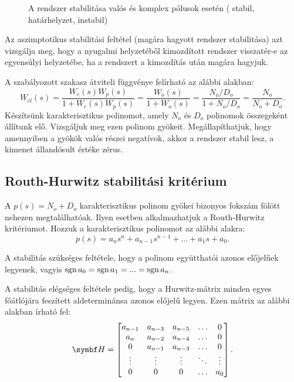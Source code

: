 \begin{figure}[htb]
  \centering
  
  \caption{
    A rendszer stabilitása valós és komplex pólusok esetén
    ({\color{darkBlue} stabil},
    {\color{darkYellow} határhelyzet},
    {\color{darkRed} instabil})
  }
  \label{fig:asymptotic-poles}
\end{figure}
Az aszimptotikus stabilitási feltétel (magára hagyott rendszer stabilitása)
azt vizsgálja meg, hogy a nyugalmi helyzetéből kimozdított rendszer visszatér-e
az egyensúlyi helyzetébe, ha a rendszert a kimozdítás után magára hagyjuk.

A szabályozott szakasz átviteli függvénye felírható az alábbi alakban:
\begin{equation}
  W_{cl}(s)
  = \frac{W_c(s) W_p(s)}{1 + W_c(s) W_p(s)}
  = \frac{W_o(s)}{1 + W_o(s)}
  = \frac{N_o / D_o}{1 + N_o / D_o}
  = \frac{N_o}{N_o + D_o}
  .
  \label{eq:asymptotic-cl}
\end{equation}
Készítsünk karakterisztikus polinomot, amely $N_o$ és $D_o$ polinomok
összegeként állítunk elő. Vizsgáljuk meg ezen polinom gyökeit. Megállapíthatjuk,
hogy amennyiben a gyökök valós részei negatívok, akkor a rendszer stabil lesz,
a kimenet állandósult értéke zérus.

\subsection{Routh-Hurwitz stabilitási kritérium}

A $p(s) = N_o + D_o$ karakterisztikus polinom gyökei bizonyos fokszám fölött
nehezen megtalálhatóak. Ilyen esetben alkalmazhatjuk a Routh-Hurwitz
kritériumot. Hozzuk a karakterisztikus polinomot az alábbi alakra:
\begin{equation}
  p(s) = a_n s^n + a_{n-1} s^{n-1} + \dots + a_1 s + a_0.
  \label{eq:RH-poles}
\end{equation}

A stabilitás szükséges feltétele, hogy a polinom együtthatói azonos előjelűek
legyenek, vagyis $\operatorname{sgn} a_0 = \operatorname{sgn} a_1 = ... = \operatorname{sgn} a_n$.

A stabilitás elégséges feltétele pedig, hogy a Hurwitz-mátrix minden egyes
főátlójára feszített aldeterminánsa azonos előjelű legyen. Ezen mátrix az
alábbi alakban írható fel:
\begin{equation}
  \rmat H = \begin{bmatrix}
    a_{n-1} & a_{n-3} & a_{n-5} & \hdots & 0      \\
    a_{n}   & a_{n-2} & a_{n-4} & \hdots & 0      \\
    0       & a_{n-1} & a_{n-3} & \hdots & 0      \\
    \vdots  & \vdots  & \vdots  & \ddots & \vdots \\
    0       & 0       & 0       & \hdots & a_0    \\
  \end{bmatrix}
  .
  \label{eq:RH-matrix}
\end{equation}

